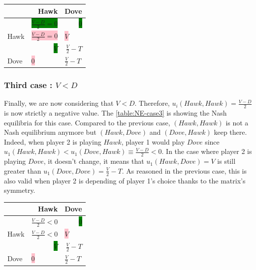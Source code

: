\documentclass{article}
\begin{document}
\begin{center}
\begin{tabular}{|l|r|r|}
  \hline
  			   & Hawk & Dove \\
  \hline
  		   & \hspace{1cm} \colorbox{green}{$\frac{V-D}{2}=0$} & \colorbox{green}{0} \\
  	Hawk &	\multicolumn{1}{|l|}{\colorbox{pink}{$\frac{V-D}{2}=0$}}		& 	\multicolumn{1}{|l|}{\colorbox{pink}{$V$}}		\\
  \hline
    		   & \multicolumn{1}{|r|}{\colorbox{green}{$V$}} & \hspace{1cm} $\frac{V}{2}-T$  \\
  Dove &	\multicolumn{1}{|l|}{\colorbox{pink}{0}}		& 	\multicolumn{1}{|l|}{$\frac{V}{2}-T$}		\\
  \hline
\end{tabular}
\label{table:NE-case2}
\end{center}

\subsubsection{Third case : $V<D$}
Finally, we are now considering that $V<D$. Therefore, $u_{i}(Hawk, Hawk) = \frac{V-D}{2}$ is now strictly a negative value. 
The \autoref{table:NE-case3} is showing the Nash equilibria for this case. Compared to the previous case, $(Hawk,Hawk)$ is not a Nash equilibrium anymore but $(Hawk,Dove)$ and $(Dove,Hawk)$ keep there. Indeed, when player 2 is playing $Hawk$, player 1 would play $Dove$ since $u_{1}(Hawk, Hawk) < u_{1}(Dove, Hawk) \equiv \frac{V-D}{2} < 0$. In the case where player 2 is playing $Dove$, it doesn't change, it means that  $u_{1}(Hawk, Dove) = V$ is still greater than $u_{1}(Dove, Dove) = \frac{V}{2}-T$. As reasoned in the previous case, this is also valid when player 2 is depending of player 1's choice thanks to the matrix's symmetry. \\

\begin{center}
\end{center}

\begin{center}
\begin{tabular}{|l|r|r|}
  \hline
  			   & Hawk & Dove \\
  \hline
  		   & \hspace{1cm} $\frac{V-D}{2}<0$ & \colorbox{green}{0} \\
  	Hawk &	\multicolumn{1}{|l|}{$\frac{V-D}{2}<0$}		& 	\multicolumn{1}{|l|}{\colorbox{pink}{$V$}}		\\
  \hline
    		   & \multicolumn{1}{|r|}{\colorbox{green}{$V$}} & \hspace{1cm} $\frac{V}{2}-T$  \\
  Dove &	\multicolumn{1}{|l|}{\colorbox{pink}{0}}		& 	\multicolumn{1}{|l|}{$\frac{V}{2}-T$}		\\
  \hline
\end{tabular}
\label{table:NE-case3}
\end{center}
\end{document}
